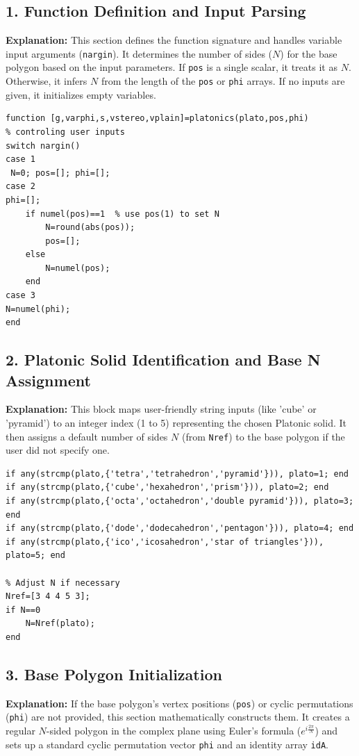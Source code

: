 \subsection{1. Function Definition and Input Parsing}
\textbf{Explanation:} 
This section defines the function signature and handles variable input arguments (\texttt{nargin}). It determines the number of sides ($N$) for the base polygon based on the input parameters. If \texttt{pos} is a single scalar, it treats it as $N$. Otherwise, it infers $N$ from the length of the \texttt{pos} or \texttt{phi} arrays. If no inputs are given, it initializes empty variables.

\begin{lstlisting}
function [g,varphi,s,vstereo,vplain]=platonics(plato,pos,phi)
% controling user inputs
switch nargin()
case 1
 N=0; pos=[]; phi=[];
case 2
phi=[];
    if numel(pos)==1  % use pos(1) to set N
        N=round(abs(pos)); 
        pos=[];
    else
        N=numel(pos);
    end
case 3
N=numel(phi);
end
\end{lstlisting}

\subsection{2. Platonic Solid Identification and Base N Assignment}
\textbf{Explanation:} 
This block maps user-friendly string inputs (like 'cube' or 'pyramid') to an integer index (1 to 5) representing the chosen Platonic solid. It then assigns a default number of sides $N$ (from \texttt{Nref}) to the base polygon if the user did not specify one. 

\begin{lstlisting}
if any(strcmp(plato,{'tetra','tetrahedron','pyramid'})), plato=1; end
if any(strcmp(plato,{'cube','hexahedron','prism'})), plato=2; end
if any(strcmp(plato,{'octa','octahedron','double pyramid'})), plato=3; end
if any(strcmp(plato,{'dode','dodecahedron','pentagon'})), plato=4; end
if any(strcmp(plato,{'ico','icosahedron','star of triangles'})), plato=5; end

% Adjust N if necessary
Nref=[3 4 4 5 3];
if N==0 
    N=Nref(plato);
end
\end{lstlisting}

\subsection{3. Base Polygon Initialization}
\textbf{Explanation:} 
If the base polygon's vertex positions (\texttt{pos}) or cyclic permutations (\texttt{phi}) are not provided, this section mathematically constructs them. It creates a regular $N$-sided polygon in the complex plane using Euler's formula ($e^{i \frac{2\pi}{N}}$) and sets up a standard cyclic permutation vector \texttt{phi} and an identity array \texttt{idA}.

